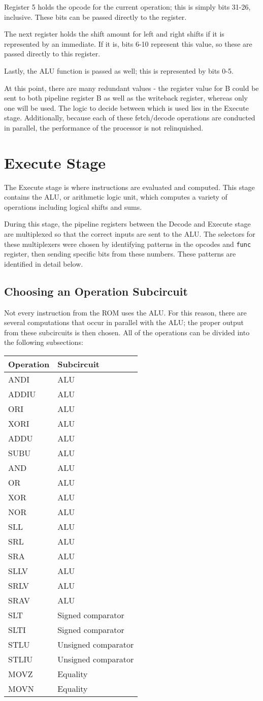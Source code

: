 Register 5 holds the opcode for the current operation; this is simply
bits 31-26, inclusive. These bits can be passed directly to the
register.

The next register holds the shift amount for left and right shifts if it
is represented by an immediate. If it is, bits 6-10 represent this
value, so these are passed directly to this register.

Lastly, the ALU function is passed as well; this is represented by bits
0-5.

At this point, there are many redundant values - the register value for
B could be sent to both pipeline register B as well as the writeback
register, whereas only one will be used. The logic to decide between
which is used lies in the Execute stage. Additionally, because each of
these fetch/decode operations are conducted in parallel, the performance
of the processor is not relinquished.

\section{Execute Stage}\label{execute-stage}

The Execute stage is where instructions are evaluated and computed. This
stage contains the ALU, or arithmetic logic unit, which computes a
variety of operations including logical shifts and sums.

During this stage, the pipeline registers between the Decode and Execute
stage are multiplexed so that the correct inputs are sent to the ALU.
The selectors for these multiplexers were chosen by identifying patterns
in the opcodes and \texttt{func} register, then sending specific bits
from these numbers. These patterns are identified in detail below.

\subsection{Choosing an Operation
Subcircuit}\label{choosing-an-operation-subcircuit}

Not every instruction from the ROM uses the ALU. For this reason, there
are several computations that occur in parallel with the ALU; the proper
output from these subcircuits is then chosen. All of the operations can
be divided into the following subsections:

\begin{longtable}[c]{@{}ll@{}}
\toprule
Operation & Subcircuit\tabularnewline
\midrule
\endhead
ANDI & ALU\tabularnewline
ADDIU & ALU\tabularnewline
ORI & ALU\tabularnewline
XORI & ALU\tabularnewline
ADDU & ALU\tabularnewline
SUBU & ALU\tabularnewline
AND & ALU\tabularnewline
OR & ALU\tabularnewline
XOR & ALU\tabularnewline
NOR & ALU\tabularnewline
SLL & ALU\tabularnewline
SRL & ALU\tabularnewline
SRA & ALU\tabularnewline
SLLV & ALU\tabularnewline
SRLV & ALU\tabularnewline
SRAV & ALU\tabularnewline
SLT & Signed comparator\tabularnewline
SLTI & Signed comparator\tabularnewline
STLU & Unsigned comparator\tabularnewline
STLIU & Unsigned comparator\tabularnewline
MOVZ & Equality\tabularnewline
MOVN & Equality\tabularnewline
\bottomrule
\end{longtable}

